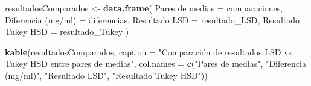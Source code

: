 \documentclass[
]{article}
\newenvironment{Shaded}{\begin{snugshade}}{\end{snugshade}}
\newcommand{\AttributeTok}[1]{\textcolor[rgb]{0.13,0.29,0.53}{#1}}
\newcommand{\FunctionTok}[1]{\textcolor[rgb]{0.13,0.29,0.53}{\textbf{#1}}}
\newcommand{\NormalTok}[1]{#1}
\newcommand{\OtherTok}[1]{\textcolor[rgb]{0.56,0.35,0.01}{#1}}
\newcommand{\StringTok}[1]{\textcolor[rgb]{0.31,0.60,0.02}{#1}}
\begin{document}
\begin{Shaded}
\begin{Highlighting}[]
\NormalTok{resultadosComparados }\OtherTok{\textless{}{-}} \FunctionTok{data.frame}\NormalTok{(}
  \StringTok{\textasciigrave{}}\AttributeTok{Pares de medias}\StringTok{\textasciigrave{}} \OtherTok{=}\NormalTok{ comparaciones,}
  \StringTok{\textasciigrave{}}\AttributeTok{Diferencia (mg/ml)}\StringTok{\textasciigrave{}} \OtherTok{=}\NormalTok{ diferencias,}
  \StringTok{\textasciigrave{}}\AttributeTok{Resultado LSD}\StringTok{\textasciigrave{}} \OtherTok{=}\NormalTok{ resultado\_LSD,}
  \StringTok{\textasciigrave{}}\AttributeTok{Resultado Tukey HSD}\StringTok{\textasciigrave{}} \OtherTok{=}\NormalTok{ resultado\_Tukey}
\NormalTok{)}


\FunctionTok{kable}\NormalTok{(resultadosComparados,}
      \AttributeTok{caption =} \StringTok{"Comparación de resultados LSD vs Tukey HSD entre pares de medias"}\NormalTok{,}
      \AttributeTok{col.names =} \FunctionTok{c}\NormalTok{(}\StringTok{"Pares de medias"}\NormalTok{, }\StringTok{"Diferencia (mg/ml)"}\NormalTok{, }\StringTok{"Resultado LSD"}\NormalTok{, }\StringTok{"Resultado Tukey HSD"}\NormalTok{))}
\end{Highlighting}
\end{Shaded}
\end{document}
